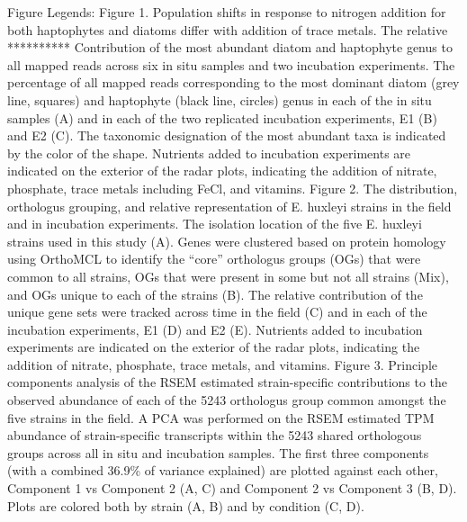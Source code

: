 Figure Legends: 
Figure 1. Population shifts in response to nitrogen addition for both haptophytes and diatoms differ with addition of trace metals. The relative **********
Contribution of the most abundant diatom and haptophyte genus to all mapped reads across six in situ samples and two incubation experiments. The percentage of all mapped reads corresponding to the most dominant diatom (grey line, squares) and haptophyte (black line, circles) genus in each of the in situ samples (A) and in each of the two replicated incubation experiments, E1 (B) and E2 (C). The taxonomic designation of the most abundant taxa is indicated by the color of the shape. Nutrients added to incubation experiments are indicated on the exterior of the radar plots, indicating the addition of nitrate, phosphate, trace metals including FeCl, and vitamins.
Figure 2. The distribution, orthologus grouping, and relative representation of E. huxleyi strains in the field and in incubation experiments. The isolation location of the five E. huxleyi strains used in this study (A). Genes were clustered based on protein homology using OrthoMCL to identify the “core” orthologus groups (OGs) that were common to all strains, OGs that were present in some but not all strains (Mix), and OGs unique to each of the strains (B). The relative contribution of the unique gene sets were tracked across time in the field (C) and in each of the incubation experiments, E1 (D) and E2 (E). Nutrients added to incubation experiments are indicated on the exterior of the radar plots, indicating the addition of nitrate, phosphate, trace metals, and vitamins.
Figure 3. Principle components analysis of the RSEM estimated strain-specific contributions to the observed abundance of each of the 5243 orthologus group common amongst the five strains in the field. A PCA was performed on the RSEM estimated TPM abundance of strain-specific transcripts within the 5243 shared orthologous groups across all in situ and incubation samples. The first three components (with a combined 36.9\% of variance explained) are plotted against each other, Component 1 vs Component 2 (A, C) and Component 2 vs Component 3 (B, D). Plots are colored both by strain (A, B) and by condition (C, D). 

